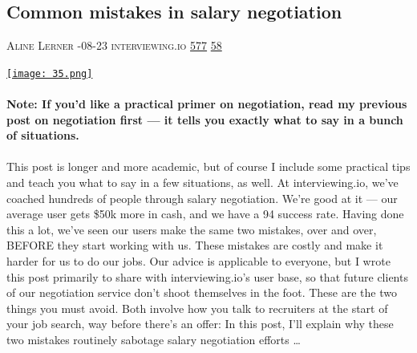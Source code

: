 \documentclass[10pt,a4paper]{article}
\begin{document}
\begin{multicols}{2}
\raggedcolumns
\noindent\begin{minipage}{\linewidth}
\medskip
\subsection{Common mistakes in salary negotiation}
\textsc{\footnotesize
{\scriptsize\faUser}\space 
Aline Lerner 
{\scriptsize\faCalendar}-08-23 
{\scriptsize\faGlobe}\space 
interviewing.io 
{\scriptsize\faThumbsOUp}\space 
\href{http://news.ycombinator.com/item?id=37239747\&utm\_term=comment}{577} 
{\scriptsize\faComments}\space 
\href{http://news.ycombinator.com/item?id=37239747\&utm\_term=comment}{58} 
}
\par\medskip\noindent
\href{https://interviewing.io/blog/sabotage-salary-negotiation-before-even-start?utm\_source=hackernewsletter\&utm\_medium=email\&utm\_term=working}{
    \texttt{[image: 35.png]}
}
\end{minipage}
\paragraph{}
\textbf{Note: If you’d like a practical primer on negotiation, read my previous post on negotiation first — it tells you exactly what to say in a bunch of situations.}
\paragraph{}
 This post is longer and more academic, but of course I include some practical tips and teach you what to say in a few situations, as well.
At interviewing.io, we’ve coached hundreds of people through salary negotiation. We’re good at it — our average user gets \$50k more in cash, and we have a 94 success rate.
Having done this a lot, we’ve seen our users make the same two mistakes, over and over, BEFORE they start working with us. These mistakes are costly and make it harder for us to do our jobs. Our advice is applicable to everyone, but I wrote this post primarily to share with interviewing.io’s user base, so that future clients of our negotiation service don’t shoot themselves in the foot.
These are the two things you must avoid. Both involve how you talk to recruiters at the start of your job search, way before there’s an offer:
In this post, I’ll explain why these two mistakes routinely sabotage salary negotiation efforts 
\dots\par
\noindent\begin{minipage}{\linewidth}
\medskip

\end{minipage}
\end{multicols}
\end{document}
